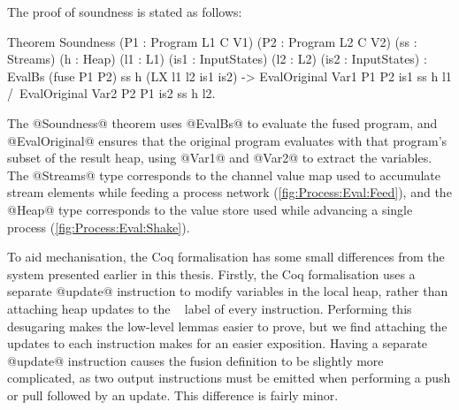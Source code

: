 The proof of soundness is stated as follows:


\begin{coq}
Theorem Soundness (P1 : Program L1 C V1) (P2  : Program L2 C V2)
                  (ss : Streams)         (h   : Heap)
                  (l1 : L1)              (is1 : InputStates)
                  (l2 : L2)              (is2 : InputStates)
  :  EvalBs (fuse P1 P2) ss h (LX l1 l2 is1 is2)
  -> EvalOriginal Var1 P1 P2 is1 ss h l1
  /\ EvalOriginal Var2 P2 P1 is2 ss h l2.
\end{coq}

The @Soundness@ theorem uses @EvalBs@ to evaluate the fused program, and @EvalOriginal@ ensures that the original program evaluates with that program's subset of the result heap, using @Var1@ and @Var2@ to extract the variables.
The @Streams@ type corresponds to the channel value map used to accumulate stream elements while feeding a process network (\cref{fig:Process:Eval:Feed}), and the @Heap@ type corresponds to the value store used while advancing a single process (\cref{fig:Process:Eval:Shake}).


To aid mechanisation, the Coq formalisation has some small differences from the system presented earlier in this thesis.
Firstly, the Coq formalisation uses a separate @update@ instruction to modify variables in the local heap, rather than attaching heap updates to the \Next~ label of every instruction.
Performing this desugaring makes the low-level lemmas easier to prove, but we find attaching the updates to each instruction makes for an easier exposition.
Having a separate @update@ instruction causes the fusion definition to be slightly more complicated, as two output instructions must be emitted when performing a push or pull followed by an update.
This difference is fairly minor.

